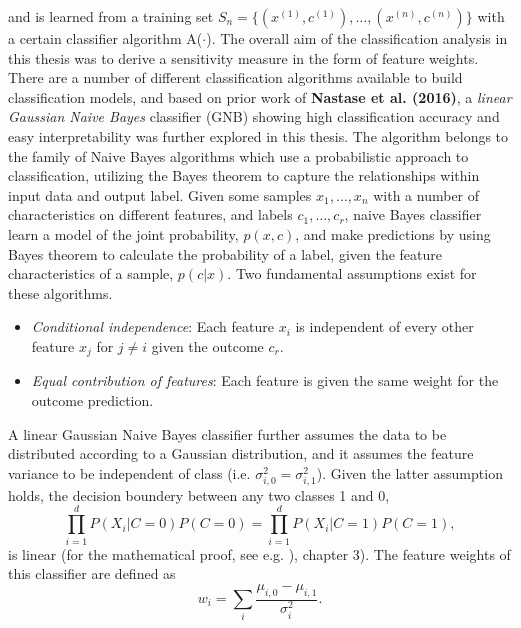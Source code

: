 \documentclass[a4paper, 12pt]{scrreprt}
\begin{document}
and is learned from a training set $S_n =\{(x^{(1)}, c^{(1)}), \ldots, (x^{(n)}, c^{(n)}) \}$ with a certain classifier algorithm A($\cdot$).
\newline
The overall aim of the classification analysis in this thesis was to derive a sensitivity measure in the form of feature weights. There are a number of different classification algorithms available to build classification models, and based on prior work of \textbf{Nastase et al. (2016)}, a \textit{linear Gaussian Naive Bayes} classifier (GNB) showing high classification accuracy and easy interpretability was further explored in this thesis. \newline
The algorithm belongs to the family of Naive Bayes algorithms which use a probabilistic approach to classification, utilizing the Bayes theorem to capture the relationships within input data and output label. Given some samples $x_1, \ldots, x_n$ with a number of characteristics on different features, and labels $c_1, \ldots, c_r$, naive Bayes classifier learn a model of the joint probability, $p(x, c)$, and make predictions by using Bayes theorem to calculate the probability of a label, given the feature characteristics of a sample, $p(c|x)$. Two fundamental assumptions exist for these algorithms. \newline 
\begin{itemize}
	\item \textit{Conditional independence}: Each feature $x_i$ is independent of every other feature $x_j$ for $j \neq i$ given the outcome $c_r$.
	\item \textit{Equal contribution of features}:  Each feature is given the same weight for the outcome prediction. 
\end{itemize} 
A linear Gaussian Naive Bayes classifier further assumes the data to be distributed according to a Gaussian distribution, and it assumes the feature variance to be independent of class (i.e. $\sigma_{i, 0}^2 = \sigma_{i, 1}^2$). Given the latter assumption holds, the decision boundery between any two classes 1 and 0,
\begin{equation}
\prod_{i=1}^{d} P(X_i |C = 0)P(C=0) = \prod_{i=1}^{d} P(X_i |C = 1)P(C=1),
\end{equation}
is linear (for the mathematical proof, see e.g. \textcite{DBLP:books/daglib/0087929}), chapter 3). The feature weights of this classifier are defined as
\begin{equation}
w_i = \sum_{i}\frac{\mu_{i, 0}-\mu_{i, 1}}{\sigma_{i}^{2}}.
\end{equation}
\end{document}
